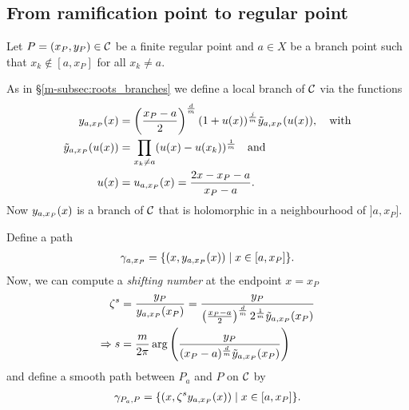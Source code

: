 \documentclass[main.tex]{subfiles}
\begin{document}
  \subsection{From ramification point to regular point}\label{subsec:ajm_finite}

   Let $P = (x_P,y_P) \in \mathcal{C}$ be a finite regular point and $a \in X$ be a branch point such that $x_k \not\in [a,x_P]$ for all $x_k \ne a$.

  As in \S \ref{m-subsec:roots_branches} we define a local branch of $\mathcal{C}$ via the functions
  \begin{align}\label{def:yax}
  \begin{split}
   y_{a,x_P}(x)  & =  \left(\frac{x_P-a}{2}\right)^{\frac{d}{m}}  (1 + u(x))^{\frac{j}{m}}  \tilde{y}_{a,x_P}(u(x)), \quad \text{with} \\
   \tilde{y}_{a,x_P}(u(x))  & =  \prod_{x_k \ne a} (u(x) - u(x_k))^{\frac{1}{m}} \quad \text{and} \\
   u(x) & =  u_{a,x_P}(x) = \frac{2x-x_P-a}{x_P-a}.
   \end{split}
  \end{align}
  Now $y_{a,x_P}(x)$ is a branch of $\mathcal{C}$ that is holomorphic in a neighbourhood of $]a,x_P]$.

  Define a path
  \begin{align*}
   \gamma_{a,x_P} = \{  (x,y_{a,x_P}(x))  \mid  x \in [a,x_P]  \}.
  \end{align*}
  Now, we can compute a \emph{shifting number} at the endpoint $x=x_P$
  \begin{align*}
   \zeta^s & = \frac{y_P}{y_{a,x_P}(x_P)} = \frac{y_P}{\left(\frac{x_P-a}{2}\right)^{\frac{d}{m}} 2^{\frac{1}{m}} \tilde{y}_{a,x_P}(x_P)} \\
   \Rightarrow s & = \frac{m}{2\pi} \arg\left(  \frac{y_P}{ (x_P-a)^{\frac{d}{m}} \tilde{y}_{a,x_P}(x_P)} \right)
  \end{align*}
  and define a smooth path between $P_a$ and $P$ on $\mathcal{C}$ by
  \begin{align*}
   \gamma_{P_a,P} = \{  (x, \zeta^s y_{a,x_P}(x))  \mid  x \in [a,x_P]  \}.
  \end{align*}
\end{document}
